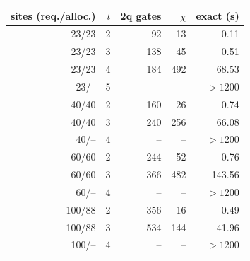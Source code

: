 \begin{tabular}{rrrrr}
\toprule
sites (req./alloc.) & $t$ & 2q gates & $\chi$ & exact (s)\\
\midrule
23/23 & 2 & 92 & 13 & 0.11\\
23/23 & 3 & 138 & 45 & 0.51\\
23/23 & 4 & 184 & 492 & 68.53\\
23/-- & 5 & -- & -- & $>1200$\\
40/40 & 2 & 160 & 26 & 0.74\\
40/40 & 3 & 240 & 256 & 66.08\\
40/-- & 4 & -- & -- & $>1200$\\
60/60 & 2 & 244 & 52 & 0.76\\
60/60 & 3 & 366 & 482 & 143.56\\
60/-- & 4 & -- & -- & $>1200$\\
100/88 & 2 & 356 & 16 & 0.49\\
100/88 & 3 & 534 & 144 & 41.96\\
100/-- & 4 & -- & -- & $>1200$\\
\bottomrule
\end{tabular}

